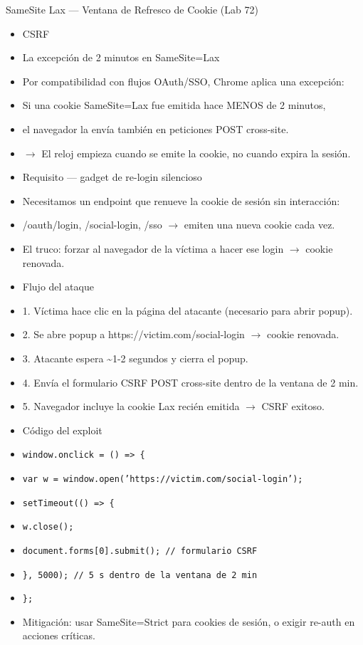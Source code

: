 \documentclass[aspectratio=169,10pt]{beamer}
\newcommand{\cmd}[1]{\texttt{\color{uznavy}#1}}
\begin{document}
\begin{frame}[allowframebreaks]{SameSite Lax --- Ventana de Refresco de Cookie (Lab 72)}
\small
  \begin{itemize}
  \item CSRF
  \item La excepción de 2 minutos en SameSite=Lax
  \item Por compatibilidad con flujos OAuth/SSO, Chrome aplica una excepción:
  \item Si una cookie SameSite=Lax fue emitida hace MENOS de 2 minutos,
  \item el navegador la envía también en peticiones POST cross-site.
  \item $\rightarrow$ El reloj empieza cuando se emite la cookie, no cuando expira la sesión.
  \item Requisito --- gadget de re-login silencioso
  \item Necesitamos un endpoint que renueve la cookie de sesión sin interacción:
  \item /oauth/login, /social-login, /sso $\rightarrow$ emiten una nueva cookie cada vez.
  \item El truco: forzar al navegador de la víctima a hacer ese login $\rightarrow$ cookie renovada.
  \item Flujo del ataque
  \item 1. Víctima hace clic en la página del atacante (necesario para abrir popup).
  \item 2. Se abre popup a https://victim.com/social-login $\rightarrow$ cookie renovada.
  \item 3. Atacante espera \textasciitilde{}1-2 segundos y cierra el popup.
  \item 4. Envía el formulario CSRF POST cross-site dentro de la ventana de 2 min.
  \item 5. Navegador incluye la cookie Lax recién emitida $\rightarrow$ CSRF exitoso.
  \item Código del exploit
  \item \cmd{window.onclick = () =\textgreater{} \{}
  \item \cmd{var w = window.open('https://victim.com/social-login');}
  \item \cmd{setTimeout(() =\textgreater{} \{}
  \item \cmd{w.close();}
  \item \cmd{document.forms[0].submit(); // formulario CSRF}
  \item \cmd{\}, 5000); // 5 s dentro de la ventana de 2 min}
  \item \cmd{\};}
  \item Mitigación: usar SameSite=Strict para cookies de sesión, o exigir re-auth en acciones críticas.
  \end{itemize}
\end{frame}
\end{document}
